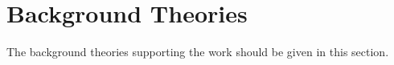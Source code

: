 \section{Background Theories} 

The background theories supporting the work should be given in this section.